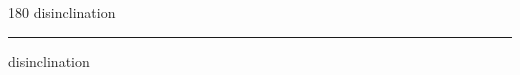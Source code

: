 
\begin{frame}
\begin{center}
\begin{turn}{180}
{\fontsize{2.5cm}{1em}\selectfont disinclination}
\end{turn}
\vspace{1em}\par  
\hrule
\vspace{1em}\par  
{\fontsize{2.5cm}{1em}\selectfont disinclination}
\end{center}
\end{frame}

